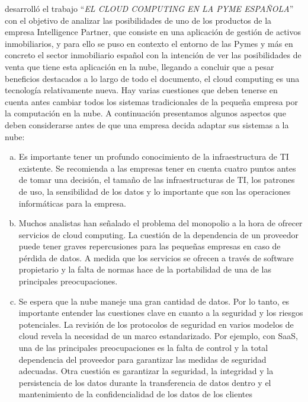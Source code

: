 \cite{diaz} desarroll\'o el trabajo ``\emph{EL CLOUD COMPUTING EN LA PYME ESPA\~NOLA}''
con el objetivo de analizar las posibilidades de uno de los productos de la empresa
Intelligence Partner, que consiste en una aplicaci\'on de gesti\'on de activos inmobiliarios, y
para ello se puso en contexto el entorno de las Pymes y m\'as en concreto el
sector inmobiliario espa\~nol con la intenci\'on de ver las posibilidades de venta
que tiene esta aplicaci\'on en la nube, llegando a concluir que a pesar beneficios
destacados a lo largo de todo el documento, el cloud computing es una tecnolog\'ia
relativamente nueva. Hay varias cuestiones que deben tenerse en cuenta antes cambiar
todos los sistemas tradicionales de la peque\~na empresa por la computaci\'on en la nube.
A continuaci\'on presentamos algunos aspectos que deben considerarse antes de que una
empresa decida adaptar sus sistemas a la nube:
\begin{enumerate}[a.]
    \item   Es importante tener un profundo conocimiento de la infraestructura de TI
            existente. Se recomienda a las empresas tener en cuenta cuatro puntos
            antes de tomar una decisi\'on, el tama\~no de las infraestructuras de TI, los
            patrones de uso, la sensibilidad de los datos y lo importante que son las
            operaciones inform\'aticas para la empresa.
    \item   Muchos analistas han se\~nalado el problema del monopolio a la hora de
            ofrecer servicios de cloud computing. La cuesti\'on de la dependencia de
            un proveedor puede tener graves repercusiones para las peque\~nas
            empresas en caso de p\'erdida de datos. A medida que los servicios se
            ofrecen a trav\'es de software propietario y la falta de normas hace de la
            portabilidad de una de las principales preocupaciones.
    \item   Se espera que la nube maneje una gran cantidad de datos. Por lo tanto,
            es importante entender las cuestiones clave en cuanto a la seguridad y
            los riesgos potenciales. La revisi\'on de los protocolos de seguridad en
            varios modelos de cloud revela la necesidad de un marco estandarizado.
            Por ejemplo, con SaaS, una de las principales preocupaciones es la falta
            de control y la total dependencia del proveedor para garantizar las
            medidas de seguridad adecuadas. Otra cuesti\'on es garantizar la
            seguridad, la integridad y la persistencia de los datos durante la
            transferencia de datos dentro y el mantenimiento de la confidencialidad
            de los datos de los clientes
\end{enumerate}

